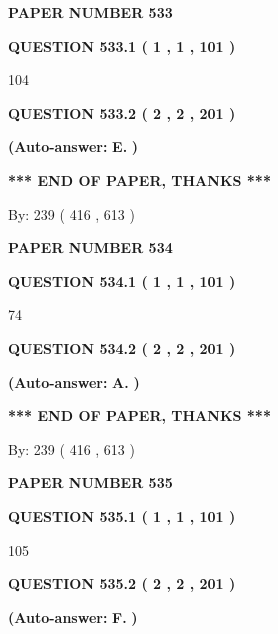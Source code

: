 \documentclass{ctexart}
\begin{document}
   
 {\textbf{ \Large{ PAPER NUMBER  533  }}}
   
   
   
   
  
  
{\textbf{\large{QUESTION
533.1 
 ( 1 , 1 , 101 )
}}}

104
  
  
{\textbf{\large{QUESTION
533.2 
 ( 2 , 2 , 201 )
}}}
 
 
{\textbf{(Auto-answer:}}
{\textbf{\large{
E.}}}
{\textbf{)}}
 
 
   
   
   
   
\vspace{1.0in} 
{\textbf{\large{ *** END OF PAPER, THANKS *** }}} 
   
   
\hspace{1.0in} By: 
 239 ( 416 ,  613 )
   
   
   
   
\newpage 
\setcounter{page}{ 
   534001 } 
   
   
 {\textbf{ \Large{ PAPER NUMBER  534  }}}
   
   
   
   
  
  
{\textbf{\large{QUESTION
534.1 
 ( 1 , 1 , 101 )
}}}

74
  
  
{\textbf{\large{QUESTION
534.2 
 ( 2 , 2 , 201 )
}}}
 
 
{\textbf{(Auto-answer:}}
{\textbf{\large{
A.}}}
{\textbf{)}}
 
 
   
   
   
   
\vspace{1.0in} 
{\textbf{\large{ *** END OF PAPER, THANKS *** }}} 
   
   
\hspace{1.0in} By: 
 239 ( 416 ,  613 )
   
   
   
   
\newpage 
\setcounter{page}{ 
   535001 } 
   
   
 {\textbf{ \Large{ PAPER NUMBER  535  }}}
   
   
   
   
  
  
{\textbf{\large{QUESTION
535.1 
 ( 1 , 1 , 101 )
}}}

105
  
  
{\textbf{\large{QUESTION
535.2 
 ( 2 , 2 , 201 )
}}}
 
 
{\textbf{(Auto-answer:}}
{\textbf{\large{
F.}}}
{\textbf{)}}
 
\end{document}
